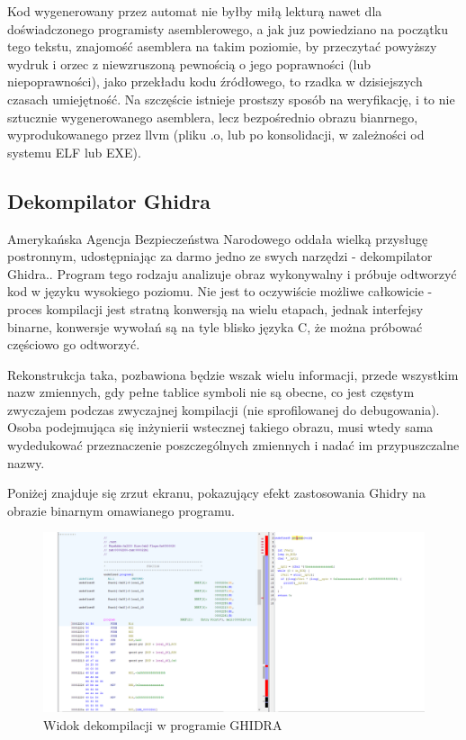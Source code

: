 Kod wygenerowany przez automat nie byłby miłą lekturą nawet dla doświadczonego programisty asemblerowego, a jak juz powiedziano na początku tego tekstu, znajomość asemblera na takim poziomie, by przeczytać powyższy wydruk i orzec z niewzruszoną pewnością o jego poprawności (lub niepoprawności), jako przekładu kodu źródłowego, to rzadka w dzisiejszych czasach umiejętność. Na szczęście istnieje prostszy sposób na weryfikację, i to nie sztucznie wygenerowanego asemblera, lecz bezpośrednio obrazu bianrnego, wyprodukowanego przez llvm (pliku .o, lub po konsolidacji, w zależności od systemu ELF lub EXE).

\subsection{Dekompilator Ghidra}
Amerykańska Agencja Bezpieczeństwa Narodowego oddała wielką przysługę postronnym, udostępniając za darmo jedno ze swych narzędzi - dekompilator Ghidra.\cite{ghidra}. Program tego rodzaju analizuje obraz wykonywalny i próbuje odtworzyć kod w języku wysokiego poziomu. Nie jest to oczywiście możliwe całkowicie - proces kompilacji jest stratną konwersją na wielu etapach, jednak interfejsy binarne, konwersje wywołań są na tyle blisko języka C, że można próbować częściowo go odtworzyć. 

Rekonstrukcja taka, pozbawiona będzie wszak wielu informacji, przede wszystkim nazw zmiennych, gdy pełne tablice symboli nie są obecne, co jest częstym zwyczajem podczas zwyczajnej kompilacji (nie sprofilowanej do debugowania). Osoba podejmująca się inżynierii wstecznej takiego obrazu, musi wtedy sama wydedukować przeznaczenie poszczególnych zmiennych i nadać im przypuszczalne nazwy.

Poniżej znajduje się zrzut ekranu, pokazujący efekt zastosowania Ghidry na obrazie binarnym omawianego programu.
\begin{figure}[h]
    \centering
    \includegraphics[width=1.3\textwidth]{images/1.progmain/ghidra1.png}
    \caption{Widok dekompilacji w programie GHIDRA}
\end{figure}

